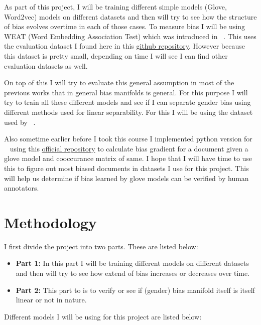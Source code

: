 \documentclass[english]{sobraep}
\begin{document}
As part of this project, I will be training different simple models (Glove, Word2vec) models on different datasets and then will try to see how the structure of bias evolves overtime in each of those cases. To measure bias I will be using WEAT (Word Embedding Association Test) which was introduced in ~\cite{caliskan_semantics_2017}. This uses the evaluation dataset I found here in this \href{https://github.com/chadaeun/weat_replication/tree/master/weat}{github repository}. However because this dataset is pretty small, depending on time I will see I can find other evaluation datasets as well.

On top of this I will try to evaluate this general assumption in most of the previous works that in general bias manifolds is general. For this purpose I will try to train all these different models and see if I can separate gender bias using different methods used for linear separability. For this I will be using the dataset used by ~\cite{garg_word_2018}.

Also sometime earlier before I took this course I implemented python version for ~\cite{brunet_understanding_2019} using this \href{https://github.com/mebrunet/understanding-bias}{official repository} to calculate bias gradient for a document given a glove model and cooccurance matrix of same. I hope that I will have time to use this to figure out most biased documents in datasets I use for this project. This will help us determine if bias learned by glove models can be verified by human annotators.




\section{Methodology}

I first divide the project into two parts. These are listed below:

\begin{itemize}
    \item \textbf{Part 1:} In this part I will be training different models on different datasets and then will try to see how extend of bias increases or decreases over time.
    \item \textbf{Part 2:} This part to is to verify or see if (gender) bias manifold itself is itself linear or not in nature.

\end{itemize}

Different models I will be using for this project are listed below:
\end{document}
